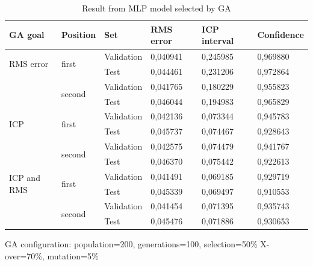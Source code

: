 \begin{table}[H]
\begin{threeparttable}
\begin{tabular}{ | l | l | l | l | l | l | }
\hline
 GA goal & Position &  Set & RMS error & ICP interval & Confidence \\
\hline
\multirow{2}{*}{RMS error}
 & \multirow{2}{*}{first} 
   & Validation & 0,040941 & 0,245985 & 0,969880 \\
 & & Test & 0,044461 & 0,231206 & 0,972864 \\
 \cline{2-6}
 & \multirow{2}{*}{second} 
   & Validation & 0,041765 & 0,180229 & 0,955823 \\
 & & Test & 0,046044 & 0,194983 & 0,965829 \\
 
\hline
 \multirow{2}{*}{ICP} 
 & \multirow{2}{*}{first} 
   & Validation & 0,042136 & 0,073344 & 0,945783 \\
 & & Test & 0,045737 & 0,074467 & 0,928643 \\
 \cline{2-6}
 & \multirow{2}{*}{second} 
   & Validation & 0,042575 & 0,074479 & 0,941767 \\
 & & Test & 0,046370 & 0,075442 & 0,922613 \\

\hline
 \multirow{2}{*}{ICP and RMS} 
 & \multirow{2}{*}{first} 
   & Validation & 0,041491 & 0,069185 & 0,929719 \\
 & & Test & 0,045339 & 0,069497 & 0,910553 \\
 \cline{2-6}
 & \multirow{2}{*}{second} 
   & Validation & 0,041454 & 0,071395 & 0,935743 \\
 & & Test & 0,045476 & 0,071886 & 0,930653 \\
 
\hline
\end{tabular}
\begin{tablenotes}
      \small
      \item GA configuration: population=200, generations=100, selection=50\% X-over=70\%, mutation=5\%
\end{tablenotes}
\caption{Result from MLP model selected by GA}
\label{tab:ga_mlp_result}
\end{threeparttable}
\end{table}

